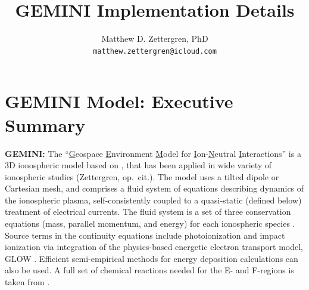 \documentclass[11pt,letterpaper]{article}
\begin{document}
\setlength{\parindent}{0mm}
\setlength{\parskip}{0.4cm}




\title{\textbf{GEMINI} Implementation Details}
\author{Matthew D. Zettergren, PhD\\ \texttt{matthew.zettergren@icloud.com}}
\maketitle

\tableofcontents

\pagebreak

\section{GEMINI Model:  Executive Summary}

\textbf{GEMINI:}  The ``\underline{G}eospace \underline{E}nvironment \underline{M}odel for \underline{I}on-\underline{N}eutral \underline{I}nteractions'' is a 3D ionospheric model based on \citet{Zettergren:2012}, that has been applied in wide variety of ionospheric studies (Zettergren, op.\ cit.).  The model uses a tilted dipole \citep{Huba:2000} or Cartesian mesh, and comprises a fluid system of equations \citep{Schunk:1977,Blelly:1993} describing dynamics of the ionospheric plasma, self-consistently coupled to a quasi-static (defined below) treatment of electrical currents. The fluid system is a set of three conservation equations (mass, parallel momentum, and energy) for each ionospheric species \citep[][ Appendix A]{Zettergren:2015}.  Source terms in the continuity equations include photoionization \citet{Solomon:2005,Richards:1994} and impact ionization via integration of the physics-based energetic electron transport model, GLOW \citep{Solomon:2001}.  Efficient semi-empirical methods for energy deposition calculations \citep{Fang:2008} can also be used.  A full set of chemical reactions needed for the E- and F-regions is taken from \citet[][]{Diloy:1996,StMaurice:1998}.
\end{document}
